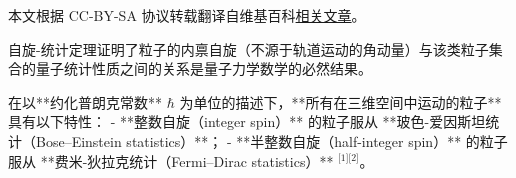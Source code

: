 
本文根据 CC-BY-SA 协议转载翻译自维基百科\href{https://en.wikipedia.org/wiki/Spin\%E2\%80\%93statistics_theorem}{相关文章}。

自旋-统计定理证明了粒子的内禀自旋（不源于轨道运动的角动量）与该类粒子集合的量子统计性质之间的关系是量子力学数学的必然结果。  

在以**约化普朗克常数** \( \hbar \) 为单位的描述下，**所有在三维空间中运动的粒子** 具有以下特性：  
- **整数自旋（integer spin）** 的粒子服从 **玻色-爱因斯坦统计（Bose–Einstein statistics）**；  
- **半整数自旋（half-integer spin）** 的粒子服从 **费米-狄拉克统计（Fermi–Dirac statistics）** \(^\text{[1][2]}\)。